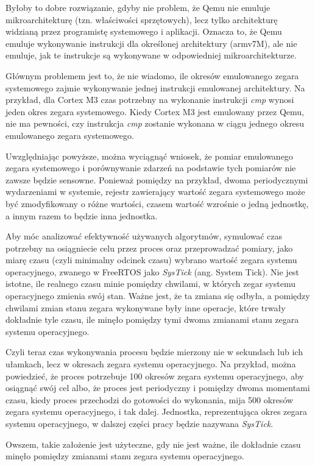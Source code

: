 \documentclass[../../main]{subfiles}
\begin{document}
Byłoby to dobre rozwiązanie, gdyby nie problem, że Qemu nie emuluje mikroarchitekturę (tzn. właściwości sprzętowych), lecz tylko architekturę widzianą przez programistę systemowego i aplikacji. Oznacza to, że Qemu emuluje wykonywanie instrukcji dla określonej architektury (\gls{arm}v7M), ale nie emuluje, jak te instrukcje są wykonywane w odpowiedniej mikroarchitekturze.

Głównym problemem jest to, że nie wiadomo, ile okresów emulowanego zegara systemowego zajmie wykonywanie jednej instrukcji emulowanej architektury. Na przykład, dla Cortex M3 czas potrzebny na wykonanie instrukcji \textit{cmp} wynosi jeden okres zegara systemowego. Kiedy Cortex M3 jest emulowany przez Qemu, nie ma pewności, czy instrukcja \textit{cmp} zostanie wykonana w ciągu jednego okresu emulowanego zegara systemowego.

Uwzględniając powyższe, można wyciągnąć wniosek, że pomiar emulowanego zegara systemowego i porównywanie zdarzeń na podstawie tych pomiarów nie zawsze będzie sensowne. Ponieważ pomiędzy na przykład, dwoma periodycznymi wydarzeniami w systemie, rejestr zawierający wartość zegara systemowego może być zmodyfikowany o różne wartości, czasem wartość wzrośnie o jedną jednostkę, a innym razem to będzie inna jednostka.

Aby móc analizować efektywność używanych algorytmów, symulować czas potrzebny na osiągniecie celu przez proces oraz przeprowadzać pomiary, jako miarę czasu (czyli minimalny odcinek czasu) wybrano wartość zegara systemu operacyjnego, zwanego w FreeRTOS jako \textit{SysTick} (ang. System Tick). Nie jest istotne, ile realnego czasu minie pomiędzy chwilami, w których zegar systemu operacyjnego zmienia swój stan. Ważne jest, że ta zmiana się odbyła, a pomiędzy chwilami zmian stanu zegara wykonywane były inne operacje, które trwały dokładnie tyle czasu, ile minęło pomiędzy tymi dwoma zmianami stanu zegara systemu operacyjnego.

Czyli teraz czas wykonywania procesu będzie mierzony nie w sekundach lub ich ułamkach, lecz w okresach zegara systemu operacyjnego. Na przykład, można powiedzieć, że proces potrzebuje 100 okresów zegara systemu operacyjnego, aby osiągnąć swój cel albo, że proces jest periodyczny i pomiędzy dwoma momentami czasu, kiedy proces przechodzi do gotowości do wykonania, mija 500 okresów zegara systemu operacyjnego, i tak dalej. Jednostka, reprezentująca okres zegara systemu operacyjnego, w dalszej części pracy będzie nazywana \textit{SysTick}.

Owszem, takie założenie jest użyteczne, gdy nie jest ważne, ile dokładnie czasu minęło pomiędzy zmianami stanu zegara systemu operacyjnego.
\end{document}

